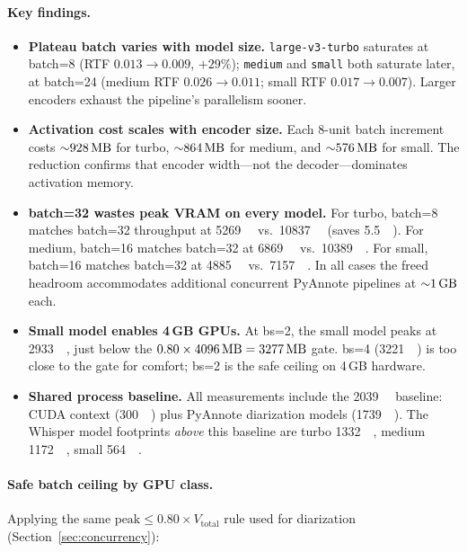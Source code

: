 \documentclass[conference,10pt]{IEEEtran}
\begin{document}
\paragraph{Key findings.}
\begin{itemize}[nosep,leftmargin=*]
  \item \textbf{Plateau batch varies with model size.}
    \texttt{large-v3-turbo} saturates at batch=8 (RTF $0.013 \to 0.009$,
    $+29\%$); \texttt{medium} and \texttt{small} both saturate later,
    at batch=24 (medium RTF $0.026 \to 0.011$; small RTF $0.017 \to 0.007$).
    Larger encoders exhaust the pipeline's parallelism sooner.
  \item \textbf{Activation cost scales with encoder size.}  Each 8-unit
    batch increment costs ${\sim}\SI{928}{\mega\byte}$ for turbo,
    ${\sim}\SI{864}{\mega\byte}$ for medium, and
    ${\sim}\SI{576}{\mega\byte}$ for small.  The reduction confirms that
    encoder width---not the decoder---dominates activation memory.
  \item \textbf{batch=32 wastes peak VRAM on every model.}  For turbo,
    batch=8 matches batch=32 throughput at \SI{5269}{\mega\byte} vs.\
    \SI{10837}{\mega\byte} (saves \SI{5.5}{\giga\byte}).  For medium,
    batch=16 matches batch=32 at \SI{6869}{\mega\byte} vs.\ \SI{10389}{\mega\byte}.
    For small, batch=16 matches batch=32 at \SI{4885}{\mega\byte} vs.\ \SI{7157}{\mega\byte}.
    In all cases the freed headroom accommodates additional concurrent
    PyAnnote pipelines at ${\sim}\SI{1}{\giga\byte}$ each.
  \item \textbf{Small model enables 4\,GB GPUs.}  At bs=2, the small model
    peaks at \SI{2933}{\mega\byte}, just below the
    $0.80 \times \SI{4096}{\mega\byte} = \SI{3277}{\mega\byte}$ gate.
    bs=4 (\SI{3221}{\mega\byte}) is too close to the gate for comfort;
    bs=2 is the safe ceiling on 4\,GB hardware.
  \item \textbf{Shared process baseline.}  All measurements include the
    \SI{2039}{\mega\byte} baseline: CUDA context (\SI{300}{\mega\byte}) plus
    PyAnnote diarization models (\SI{1739}{\mega\byte}).  The Whisper model
    footprints \textit{above} this baseline are turbo \SI{1332}{\mega\byte},
    medium \SI{1172}{\mega\byte}, small \SI{564}{\mega\byte}.
\end{itemize}

\paragraph{Safe batch ceiling by GPU class.}
Applying the same $\text{peak} \le 0.80 \times V_{\text{total}}$ rule
used for diarization (Section~\ref{sec:concurrency}):
\end{document}
